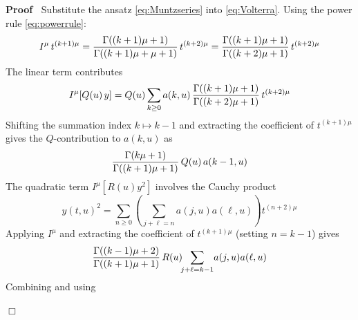 \documentclass{article}
\newenvironment{proof}{\noindent\textbf{Proof\ }}{\hspace*{\fill}$\Box$\medskip}
\begin{document}
\begin{proof}
  Substitute the ansatz \eqref{eq:Muntzseries} into \eqref{eq:Volterra}. Using
  the power rule \eqref{eq:powerrule}:
  \begin{equation}
    I^{\mu}  \hspace{0.17em} t^{(k + 1) \mu} = \frac{\Gamma ((k + 1) \mu +
    1)}{\Gamma ((k + 1) \mu + \mu + 1)}  \hspace{0.17em} t^{(k + 2) \mu} =
    \frac{\Gamma ((k + 1) \mu + 1)}{\Gamma ((k + 2) \mu + 1)}  \hspace{0.17em}
    t^{(k + 2) \mu}
  \end{equation}
  The linear term contributes
  \begin{equation}
    I^{\mu}  \hspace{-0.17em} \left[ Q (u) \hspace{0.17em} y \right] = Q (u) 
    \sum_{k \ge 0} a (k, u) \hspace{0.17em} \frac{\Gamma ((k + 1) \mu +
    1)}{\Gamma ((k + 2) \mu + 1)}  \hspace{0.17em} t^{(k + 2) \mu}
  \end{equation}
  Shifting the summation index $k \mapsto k - 1$ and extracting the
  coefficient of $t^{(k + 1) \mu}$ gives the $Q$-contribution to $a (k, u)$ as
  \begin{equation}
    \frac{\Gamma (k \mu + 1)}{\Gamma ((k + 1) \mu + 1)}  \hspace{0.17em} Q (u)
    \hspace{0.17em} a (k - 1, u)
  \end{equation}
  The quadratic term $I^{\mu}  [R (u) y^2]$ involves the Cauchy product
  \begin{equation}
    y (t, u)^2 = \sum_{n \ge 0} \left( \sum_{j + \ell = n} a (j, u) a (\ell,
    u) \right) t^{(n + 2) \mu}
  \end{equation}
  Applying $I^{\mu}$ and extracting the coefficient of $t^{(k + 1) \mu}$
  (setting $n = k - 1$) gives
  \begin{equation}
    \frac{\Gamma ((k - 1) \mu + 2)}{\Gamma ((k + 1) \mu + 1)}  \hspace{0.17em}
    R (u)  \hspace{-0.17em} \hspace{-0.17em} \sum_{j + \ell = k - 1}
    \hspace{-0.17em} a (j, u) a (\ell, u)
  \end{equation}
  Combining and using
  

\end{proof}
\end{document}
